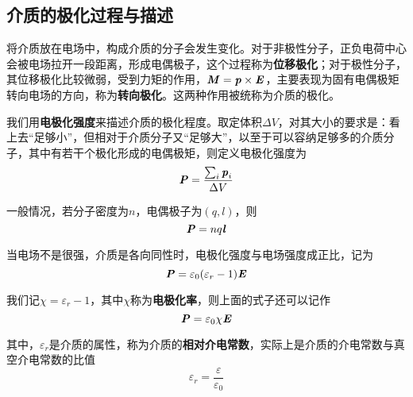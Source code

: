 \documentclass[UTF8,openany]{book}
\begin{document}
	\subsection{介质的极化过程与描述}
	\par 将介质放在电场中，构成介质的分子会发生变化。对于非极性分子，正负电荷中心会被电场拉开一段距离，形成电偶极子，这个过程称为\textbf{位移极化}；对于极性分子，其位移极化比较微弱，受到力矩的作用，$\textbf{\textit{M}}=\textbf{\textit{p}}\times\textbf{\textit{E}}$，主要表现为固有电偶极矩转向电场的方向，称为\textbf{转向极化}。这两种作用被统称为介质的极化。
	\par 我们用\textbf{电极化强度}来描述介质的极化程度。取定体积$\Delta V$，对其大小的要求是：看上去“足够小”，但相对于介质分子又“足够大”，以至于可以容纳足够多的介质分子，其中有若干个极化形成的电偶极矩，则定义电极化强度为
	$$\textbf{\textit{P}}=\frac{\sum_{i}\textbf{\textit{p}}_i}{\Delta V}$$
	\par 一般情况，若分子密度为$n$，电偶极子为$(q,l)$，则
	$$\textbf{\textit{P}}=nq\textbf{\textit{l}}$$
	\par 当电场不是很强，介质是各向同性时，电极化强度与电场强度成正比，记为
	$$\textbf{\textit{P}}=\varepsilon_0(\varepsilon_{r}-1)\textbf{\textit{E}}$$
	\par 我们记$\chi=\varepsilon_{r}-1$，其中$\chi$称为\textbf{电极化率}，则上面的式子还可以记作
	$$\textbf{\textit{P}}=\varepsilon_{0}\chi\textbf{\textit{E}}$$
	\par 其中，$\varepsilon_{r}$是介质的属性，称为介质的\textbf{相对介电常数}，实际上是介质的介电常数与真空介电常数的比值
	$$\varepsilon_{r}=\frac{\varepsilon}{\varepsilon_{0}}$$
\end{document}
